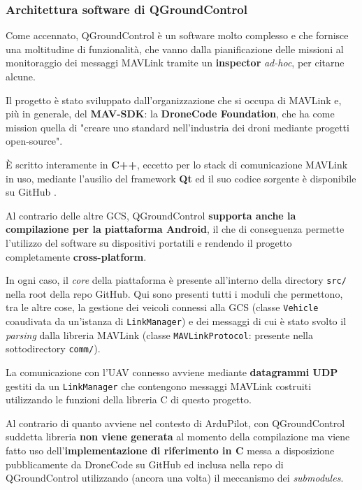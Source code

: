 \documentclass[a4paper, 12pt, oneside]{article}
\theoremstyle{definition}
\begin{document}
\subsubsection{Architettura software di QGroundControl}

Come accennato, QGroundControl è un software molto complesso e che fornisce una moltitudine di funzionalità, che vanno dalla pianificazione delle missioni al monitoraggio dei messaggi MAVLink tramite un \textbf{inspector} \textit{ad-hoc}, per citarne alcune.

Il progetto è stato sviluppato dall'organizzazione che si occupa di MAVLink e, più in generale, del \textbf{MAV-SDK}: la \textbf{DroneCode Foundation}, che ha come mission quella di "creare uno standard nell'industria dei droni mediante progetti open-source"\cite{dronecode}. 

È scritto interamente in \textbf{C++}, eccetto per lo stack di comunicazione MAVLink in uso, mediante l'ausilio del framework \textbf{Qt} ed il suo codice sorgente è disponibile su GitHub \cite{qgc-github}.

Al contrario delle altre GCS, QGroundControl \textbf{supporta anche la compilazione per la piattaforma Android}\cite{qgc-github-android}, il che di conseguenza permette l'utilizzo del software su dispositivi portatili e rendendo il progetto completamente \textbf{cross-platform}.

In ogni caso, il \textit{core} della piattaforma è presente all'interno della directory \texttt{src/} nella root della repo GitHub. Qui sono presenti tutti i moduli che permettono, tra le altre cose, la gestione dei veicoli connessi alla GCS (classe \texttt{Vehicle} coaudivata da un'istanza di \texttt{LinkManager}) e dei messaggi di cui è stato svolto il \textit{parsing} dalla libreria MAVLink (classe \texttt{MAVLinkProtocol}: presente nella sottodirectory \texttt{comm/}).

La comunicazione con l'UAV connesso avviene mediante \textbf{datagrammi UDP} gestiti da un \texttt{LinkManager} che contengono messaggi MAVLink costruiti utilizzando le funzioni della libreria C di questo progetto.

Al contrario di quanto avviene nel contesto di ArduPilot, con QGroundControl suddetta libreria \textbf{non viene generata} al momento della compilazione ma viene fatto uso dell'\textbf{implementazione di riferimento in C} \cite{mavlink-c-implementation} messa a disposizione pubblicamente da DroneCode su GitHub ed inclusa nella repo di QGroundControl utilizzando (ancora una volta) il meccanismo dei \textit{submodules}.
\end{document}
